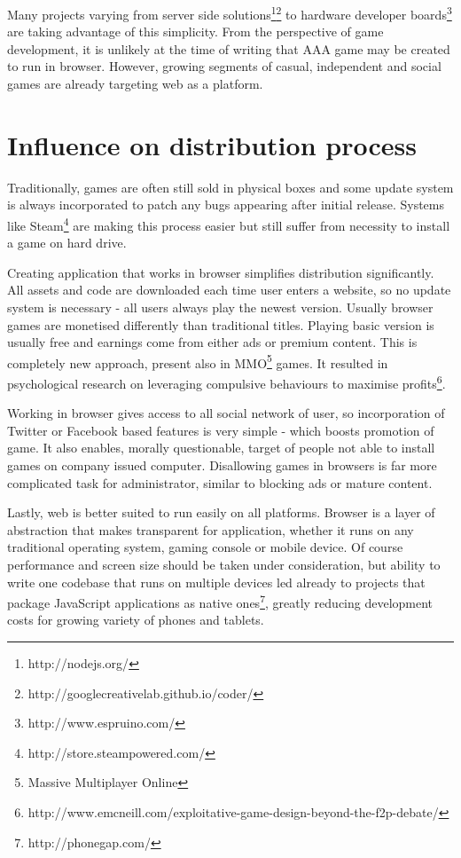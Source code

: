 Many projects varying from server side solutions\footnote{http://nodejs.org/}\footnote{http://googlecreativelab.github.io/coder/} to hardware developer boards\footnote{http://www.espruino.com/} are taking advantage of this simplicity. From the perspective of game development, it is unlikely at the time of writing that AAA game may be created to run in browser. However, growing segments of casual, independent and social games are already targeting web as a platform.

\section{Influence on distribution process}

Traditionally, games are often still sold in physical boxes and some update system is always incorporated to patch any bugs appearing after initial release. Systems like Steam\footnote{http://store.steampowered.com/} are making this process easier but still suffer from necessity to install a game on hard drive.

Creating application that works in browser simplifies distribution significantly. All assets and code are downloaded each time user enters a website, so no update system is necessary - all users always play the newest version. Usually browser games are monetised differently than traditional titles. Playing basic version is usually free and earnings come from either ads or premium content. This is completely new approach, present also in MMO\footnote{Massive Multiplayer Online} games. It resulted in psychological research on leveraging compulsive behaviours to maximise profits\footnote{http://www.emcneill.com/exploitative-game-design-beyond-the-f2p-debate/}.

Working in browser gives access to all social network of user, so incorporation of Twitter or Facebook based features is very simple - which boosts promotion of game. It also enables, morally questionable, target of people not able to install games on company issued computer. Disallowing games in browsers is far more complicated task for administrator, similar to blocking ads or mature content.

Lastly, web is better suited to run easily on all platforms. Browser is a layer of abstraction that makes transparent for application, whether it runs on any traditional operating system, gaming console or mobile device. Of course  performance and screen size should be taken under consideration, but ability to write one codebase that runs on multiple devices led already to projects that package JavaScript applications as native ones\footnote{http://phonegap.com/}, greatly reducing development costs for growing variety of phones and tablets.

